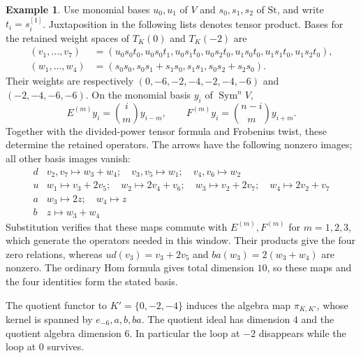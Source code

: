 \documentclass[11pt,reqno]{amsart}
\theoremstyle{definition}
\newtheorem{example}[theorem]{Example}
\theoremstyle{remark}
\numberwithin{equation}{section}
\begin{document}
\begin{example}
Use monomial bases $u_0,u_1$ of $V$ and $s_0,s_1,s_2$ of
$\mathrm{St}$, and write $t_i=s_i^{[1]}$. Juxtaposition in the
following lists denotes tensor product. Bases for the retained
weight spaces of $T_K(0)$ and $T_K(-2)$ are
\[
 \begin{aligned}
 (v_1,\ldots,v_7)&=(u_0s_0t_0,u_0s_0t_1,u_0s_1t_0,u_0s_2t_0,
                         u_1s_0t_0,u_1s_1t_0,u_1s_2t_0),\\
 (w_1,\ldots,w_4)&=(s_0s_0,s_0s_1+s_1s_0,s_1s_1,s_0s_2+s_2s_0).
 \end{aligned}
\]
Their weights are respectively $(0,-6,-2,-4,-2,-4,-6)$ and
$(-2,-4,-6,-6)$. On the monomial basis $y_i$ of $\operatorname{Sym}^nV$,
\[
 E^{(m)}y_i=\binom{i}{m}y_{i-m},\qquad
 F^{(m)}y_i=\binom{n-i}{m}y_{i+m}.
\]
Together with the divided-power tensor formula and Frobenius twist,
these determine the retained operators. The arrows have the
following nonzero images; all other basis images vanish:
\[
\begin{array}{c|l}
 d & v_2,v_7\mapsto w_3+w_4;\quad v_3,v_5\mapsto w_1;
                                      \quad v_4,v_6\mapsto w_2\\
 u & w_1\mapsto v_3+2v_5;\quad w_2\mapsto2v_4+v_6;\quad
       w_3\mapsto v_2+2v_7;\quad w_4\mapsto2v_2+v_7\\
 a & w_3\mapsto2z;\quad w_4\mapsto z\\
 b & z\mapsto w_3+w_4
\end{array}
\]
Substitution verifies that these maps commute with $E^{(m)},F^{(m)}$
for $m=1,2,3$, which generate the operators needed in this window.
Their products give the four zero relations, whereas
$ud(v_3)=v_3+2v_5$ and $ba(w_3)=2(w_3+w_4)$ are nonzero.
The ordinary Hom formula gives total dimension $10$, so these
maps and the four identities form the stated basis.

The quotient functor to $K'=\{0,-2,-4\}$ induces the algebra map
$\pi_{K,K'}$, whose kernel is spanned by
$e_{-6},a,b,ba$. The quotient ideal has dimension $4$ and the
quotient algebra dimension $6$. In particular the loop at $-2$
disappears while the loop at $0$ survives.


\end{example}
\end{document}
